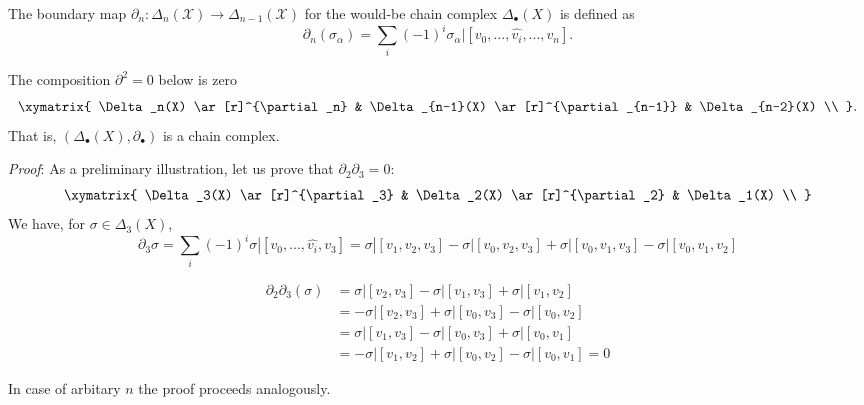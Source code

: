 \documentclass[11pt,a4paper]{report}
\begin{document}
		      The boundary map
		      $\partial_n: \Delta_n(\mathcal{X}) \rightarrow \Delta_{n-1}(\mathcal{X})$ for the would-be chain complex $\Delta_\bullet(X)$ is defined as
		      \[
		         \partial_n(\sigma_\alpha) = \sum\limits_i (-1)^i \sigma_\alpha | [v_0, ... ,\widehat{v_i}, ... , v_n].
              \]

            \begin{Lemma}\label{delta2}
             The composition $\partial^2=0$ below is zero
             \[
                \xymatrix{
                    \Delta_n(X)  \ar[r]^{\partial_n} &
                    \Delta_{n-1}(X)  \ar[r]^{\partial_{n-1}} &
                    \Delta_{n-2}(X)   \\ }.
             \]
             That is, $(\Delta_\bullet(X),\partial_\bullet)$ is a chain complex.
            \end{Lemma}

            \emph{Proof}: As a preliminary illustration, let us prove that $\partial_2 \partial_3 = 0$:
             \[
                \xymatrix{
                    \Delta_3(X)  \ar[r]^{\partial_3} &
                    \Delta_2(X)  \ar[r]^{\partial_2} &
                    \Delta_1(X)   \\ }
             \]
             We have, for $\sigma\in \Delta_3(X)$, \[\partial_3\sigma = \sum\limits_i (-1)^i \sigma | [v_0, ... ,\widehat{v_i}, v_3] =
             \sigma | [v_1, v_2, v_3] - \sigma | [v_0, v_2, v_3] + \sigma | [v_0, v_1, v_3] - \sigma | [v_0, v_1, v_2]\]


            \begin{equation}
                \begin{aligned}
                    \partial_2 \partial_3(\sigma) &= \sigma | [v_2, v_3] - \sigma | [v_1, v_3] + \sigma | [v_1, v_2] \\
                    &= -\sigma | [v_2, v_3] + \sigma | [v_0, v_3] - \sigma | [v_0, v_2] \\
                    &= \sigma | [v_1, v_3] - \sigma | [v_0, v_3] + \sigma | [v_0, v_1] \\
                    &= -\sigma | [v_1, v_2] + \sigma | [v_0, v_2] - \sigma | [v_0, v_1] = 0
                \end{aligned}
            \end{equation}

        In case of arbitary  $n$ the proof proceeds analogously.
\end{document}
